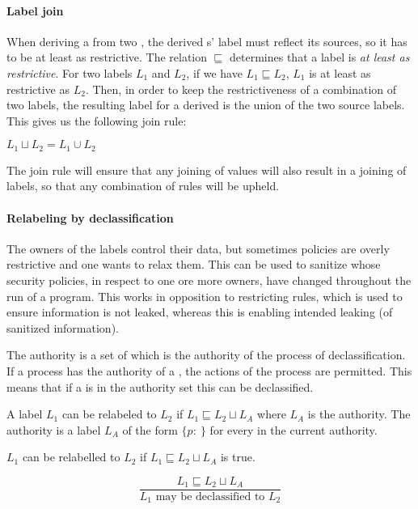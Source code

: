\paragraph{Label join}
When deriving a \xvalue{} from two \xvalues{}, the derived \xvalue{}s' label must reflect its sources, so it has to be at least as restrictive.
The relation $\sqsubseteq$ determines that a label is \textit{at least as restrictive}.
For two labels $L_1$ and $L_2$, if we have $L_1 \sqsubseteq L_2$, $L_1$ is at least as restrictive as $L_2$.
Then, in order to keep the restrictiveness of a combination of two labels, the resulting label for a derived \xvalue{} is the union of the two source labels.
This gives us the following join rule:
\begin{definition}
  $L_1 \sqcup L_2 = L_1 \cup L_2$
\end{definition}

The join rule will ensure that any joining of values will also result in a joining of labels, so that any combination of rules will be upheld.

\paragraph{Relabeling by declassification}
The owners of the labels control their data, but sometimes policies are overly restrictive and one wants to relax them.
This can be used to sanitize \xvalues{} whose security policies, in respect to one ore more owners, have changed throughout the run of a program.
This works in opposition to restricting rules, which is used to ensure information is not leaked, whereas this is enabling intended leaking (of sanitized information).

The authority is a set of \principals{} which is the authority of the process of declassification.
If a process has the authority of a \principal{}, the actions of the process are permitted.
This means that if a \principal{} is in the authority set this can be declassified.

A label $L_1$ can be relabeled to $L_2$ if $L_1 \sqsubseteq L_2 \sqcup L_A$ where $L_A$ is the authority.
The authority is a label $L_A$ of the form $\{p: \ \}$ for every \principal{} in the current authority.

$L_1$ can be relabelled to $L_2$ if $L_1 \sqsubseteq L_2 \sqcup L_A$ is true.
\begin{definition}
    $$\frac{L_1 \sqsubseteq L_2 \sqcup L_A}{L_1 \text{ may be declassified to } L_2}$$
\end{definition}

